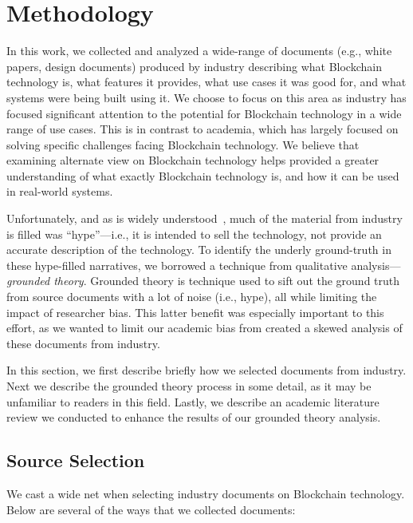 
\section{Methodology}

In this work, we collected and analyzed a wide-range of documents (e.g., white papers, design documents) produced by industry describing what Blockchain technology is, what features it provides, what use cases it was good for, and what systems were being built using it.
We choose to focus on this area as industry has focused significant attention to the potential for Blockchain technology in a wide range of use cases.
This is in contrast to academia, which has largely focused on solving specific challenges facing Blockchain technology.
We believe that examining alternate view on Blockchain technology helps provided a greater understanding of what exactly Blockchain technology is, and how it can be used in real-world systems.

Unfortunately, and as is widely understood~\cite{garnetHypeStuff}, much of the material from industry is filled was ``hype''---i.e., it is intended to sell the technology, not provide an accurate description of the technology.
To identify the underly ground-truth in these hype-filled narratives, we borrowed a technique from qualitative analysis---\textit{grounded theory}.
Grounded theory is technique used to sift out the ground truth from source documents with a lot of noise (i.e., hype), all while limiting the impact of researcher bias.
This latter benefit was especially important to this effort, as we wanted to limit our academic bias from created a skewed analysis of these documents from industry.

In this section, we first describe briefly how we selected documents from industry.
Next we describe the grounded theory process in some detail, as it may be unfamiliar to readers in this field.
Lastly, we describe an academic literature review we conducted to enhance the results of our grounded theory analysis.

\subsection{Source Selection}
We cast a wide net when selecting industry documents on Blockchain technology.
Below are several of the ways that we collected documents:


